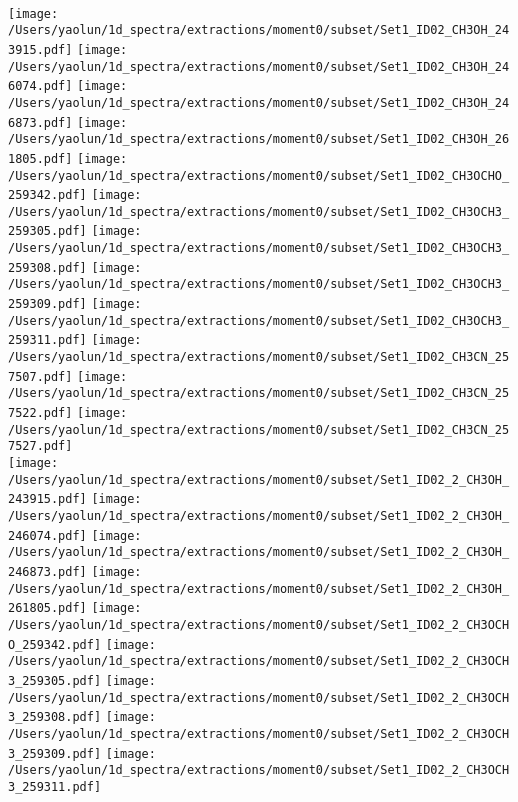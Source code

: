 \begin{figure*}[htbp!]
  \\
  \texttt{[image: /Users/yaolun/1d\_spectra/extractions/moment0/subset/Set1\_ID02\_CH3OH\_243915.pdf]}
  \texttt{[image: /Users/yaolun/1d\_spectra/extractions/moment0/subset/Set1\_ID02\_CH3OH\_246074.pdf]}
  \texttt{[image: /Users/yaolun/1d\_spectra/extractions/moment0/subset/Set1\_ID02\_CH3OH\_246873.pdf]}
  \texttt{[image: /Users/yaolun/1d\_spectra/extractions/moment0/subset/Set1\_ID02\_CH3OH\_261805.pdf]}
  \texttt{[image: /Users/yaolun/1d\_spectra/extractions/moment0/subset/Set1\_ID02\_CH3OCHO\_259342.pdf]}
  \texttt{[image: /Users/yaolun/1d\_spectra/extractions/moment0/subset/Set1\_ID02\_CH3OCH3\_259305.pdf]}
  \texttt{[image: /Users/yaolun/1d\_spectra/extractions/moment0/subset/Set1\_ID02\_CH3OCH3\_259308.pdf]}
  \texttt{[image: /Users/yaolun/1d\_spectra/extractions/moment0/subset/Set1\_ID02\_CH3OCH3\_259309.pdf]}
  \texttt{[image: /Users/yaolun/1d\_spectra/extractions/moment0/subset/Set1\_ID02\_CH3OCH3\_259311.pdf]}
  \texttt{[image: /Users/yaolun/1d\_spectra/extractions/moment0/subset/Set1\_ID02\_CH3CN\_257507.pdf]}
  \texttt{[image: /Users/yaolun/1d\_spectra/extractions/moment0/subset/Set1\_ID02\_CH3CN\_257522.pdf]}
  \texttt{[image: /Users/yaolun/1d\_spectra/extractions/moment0/subset/Set1\_ID02\_CH3CN\_257527.pdf]}
  \\
  \texttt{[image: /Users/yaolun/1d\_spectra/extractions/moment0/subset/Set1\_ID02\_2\_CH3OH\_243915.pdf]}
  \texttt{[image: /Users/yaolun/1d\_spectra/extractions/moment0/subset/Set1\_ID02\_2\_CH3OH\_246074.pdf]}
  \texttt{[image: /Users/yaolun/1d\_spectra/extractions/moment0/subset/Set1\_ID02\_2\_CH3OH\_246873.pdf]}
  \texttt{[image: /Users/yaolun/1d\_spectra/extractions/moment0/subset/Set1\_ID02\_2\_CH3OH\_261805.pdf]}
  \texttt{[image: /Users/yaolun/1d\_spectra/extractions/moment0/subset/Set1\_ID02\_2\_CH3OCHO\_259342.pdf]}
  \texttt{[image: /Users/yaolun/1d\_spectra/extractions/moment0/subset/Set1\_ID02\_2\_CH3OCH3\_259305.pdf]}
  \texttt{[image: /Users/yaolun/1d\_spectra/extractions/moment0/subset/Set1\_ID02\_2\_CH3OCH3\_259308.pdf]}
  \texttt{[image: /Users/yaolun/1d\_spectra/extractions/moment0/subset/Set1\_ID02\_2\_CH3OCH3\_259309.pdf]}
  \texttt{[image: /Users/yaolun/1d\_spectra/extractions/moment0/subset/Set1\_ID02\_2\_CH3OCH3\_259311.pdf]}

\end{figure*}

